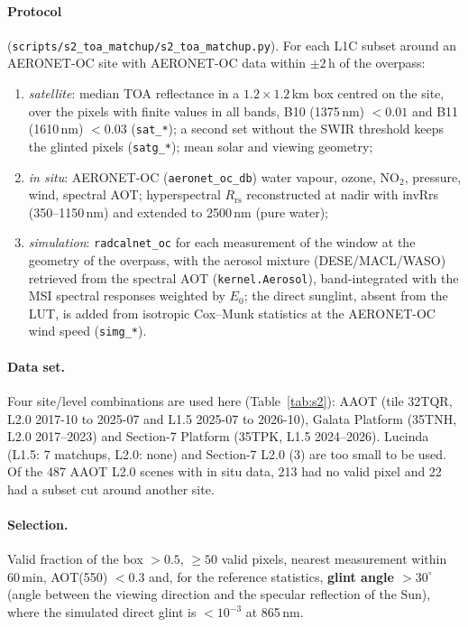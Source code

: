 \documentclass[11pt,a4paper]{article}
\newcommand{\Rrs}{R_\mathrm{rs}}
\newcommand{\code}[1]{\texttt{#1}}
\begin{document}
\paragraph{Protocol} (\code{scripts/s2\_toa\_matchup/s2\_toa\_matchup.py}).
For each L1C subset around an AERONET-OC site with AERONET-OC data within $\pm2$\,h of the overpass:
\begin{enumerate}
\item \emph{satellite}: median TOA reflectance in a $1.2\times1.2$\,km box centred on the site, over the pixels
  with finite values in all bands, B10 (1375\,nm) $<0.01$ and B11 (1610\,nm) $<0.03$ (\code{sat\_*}); a second set
  without the SWIR threshold keeps the glinted pixels (\code{satg\_*}); mean solar and viewing geometry;
\item \emph{in situ}: AERONET-OC (\code{aeronet\_oc\_db}) water vapour, ozone, NO$_2$, pressure, wind, spectral AOT;
  hyperspectral $\Rrs$ reconstructed at nadir with invRrs (350--1150\,nm) and extended to 2500\,nm (pure water);
\item \emph{simulation}: \code{radcalnet\_oc} for each measurement of the window at the geometry of the overpass,
  with the aerosol mixture (DESE/MACL/WASO) retrieved from the spectral AOT (\code{kernel.Aerosol}),
  band-integrated with the MSI spectral responses weighted by $E_0$; the direct sunglint, absent from the LUT,
  is added from isotropic Cox--Munk statistics at the AERONET-OC wind speed (\code{simg\_*}).
\end{enumerate}

\paragraph{Data set.} Four site/level combinations are used here (Table~\ref{tab:s2}): AAOT (tile 32TQR,
L2.0 2017-10 to 2025-07 and L1.5 2025-07 to 2026-10), Galata Platform (35TNH, L2.0 2017--2023) and Section-7
Platform (35TPK, L1.5 2024--2026). Lucinda (L1.5: 7 matchups, L2.0: none) and Section-7 L2.0 (3) are too
small to be used. Of the 487 AAOT L2.0 scenes with in situ data, 213 had no valid pixel and 22 had a subset
cut around another site.

\paragraph{Selection.} Valid fraction of the box $>0.5$, $\ge50$ valid pixels, nearest measurement within
60\,min, AOT(550) $<0.3$ and, for the reference statistics, \textbf{glint angle $>30^\circ$} (angle between the
viewing direction and the specular reflection of the Sun), where the simulated direct glint is
$<10^{-3}$ at 865\,nm.
\end{document}
